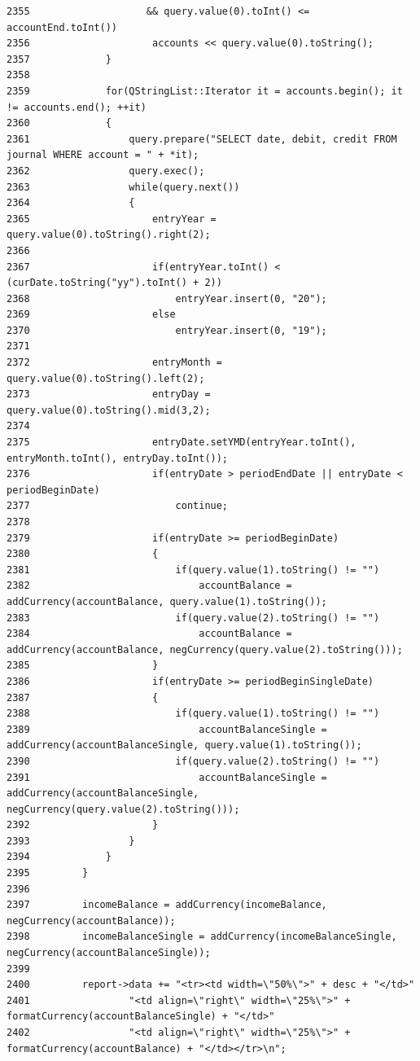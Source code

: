 \begin{verbatim}
2355                    && query.value(0).toInt() <= accountEnd.toInt())
2356                     accounts << query.value(0).toString();
2357             }
2358 
2359             for(QStringList::Iterator it = accounts.begin(); it != accounts.end(); ++it)
2360             {
2361                 query.prepare("SELECT date, debit, credit FROM journal WHERE account = " + *it);
2362                 query.exec();
2363                 while(query.next())
2364                 {
2365                     entryYear = query.value(0).toString().right(2);
2366 
2367                     if(entryYear.toInt() < (curDate.toString("yy").toInt() + 2))
2368                         entryYear.insert(0, "20");
2369                     else
2370                         entryYear.insert(0, "19");
2371 
2372                     entryMonth = query.value(0).toString().left(2);
2373                     entryDay = query.value(0).toString().mid(3,2);
2374 
2375                     entryDate.setYMD(entryYear.toInt(), entryMonth.toInt(), entryDay.toInt());
2376                     if(entryDate > periodEndDate || entryDate < periodBeginDate)
2377                         continue;
2378 
2379                     if(entryDate >= periodBeginDate)
2380                     {
2381                         if(query.value(1).toString() != "")
2382                             accountBalance = addCurrency(accountBalance, query.value(1).toString());
2383                         if(query.value(2).toString() != "")
2384                             accountBalance = addCurrency(accountBalance, negCurrency(query.value(2).toString()));
2385                     }
2386                     if(entryDate >= periodBeginSingleDate)
2387                     {
2388                         if(query.value(1).toString() != "")
2389                             accountBalanceSingle = addCurrency(accountBalanceSingle, query.value(1).toString());
2390                         if(query.value(2).toString() != "")
2391                             accountBalanceSingle = addCurrency(accountBalanceSingle, negCurrency(query.value(2).toString()));
2392                     }
2393                 }
2394             }
2395         }
2396 
2397         incomeBalance = addCurrency(incomeBalance, negCurrency(accountBalance));
2398         incomeBalanceSingle = addCurrency(incomeBalanceSingle, negCurrency(accountBalanceSingle));
2399 
2400         report->data += "<tr><td width=\"50%\">" + desc + "</td>"
2401                 "<td align=\"right\" width=\"25%\">" + formatCurrency(accountBalanceSingle) + "</td>"
2402                 "<td align=\"right\" width=\"25%\">" + formatCurrency(accountBalance) + "</td></tr>\n";

\end{verbatim}

